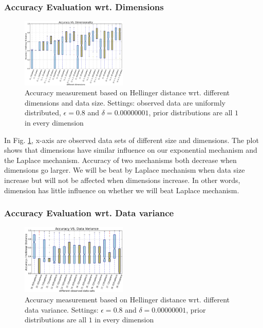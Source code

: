 \documentclass[sigconf, anonymous]{acmart}
\begin{document}
\subsubsection{Accuracy Evaluation wrt. Dimensions}
\label{subsubsec_vs_dimension}


\begin{figure}[ht]
\centering
\includegraphics[width=0.45\textwidth]{accuracy_vs_dimension.eps}
\caption{Accuracy measurement based on Hellinger distance wrt. different dimensions and data size. Settings: observed data are uniformly distributed, $\epsilon = 0.8$ and $\delta = 0.00000001$, prior distributions are all $1$ in every dimension}
\label{fig_vs_dimension}
\end{figure}

In Fig. \ref{fig_vs_dimension}, x-axis are observed data sets of different size and dimensions. The plot shows that dimensions have similar influence on our exponential mechanism and the Laplace mechanism. Accuracy of two mechanisms both decrease when dimensions go larger. We will be beat by Laplace mechanism when data size increase but will not be affected when dimensions increase. In other words, dimension has little influence on whether we will beat Laplace mechanism.


\subsubsection{Accuracy Evaluation wrt. Data variance}
\label{subsubsec_vs_variance}

\begin{figure}[ht]
\centering
\includegraphics[width=0.45\textwidth]{accuracy_vs_mean_1_1.eps}
\caption{Accuracy measurement based on Hellinger distance wrt. different data variance. Settings: $\epsilon = 0.8$ and $\delta = 0.00000001$, prior distributions are all $1$ in every dimension}
\label{fig_vs_variance}
\end{figure}
\end{document}
